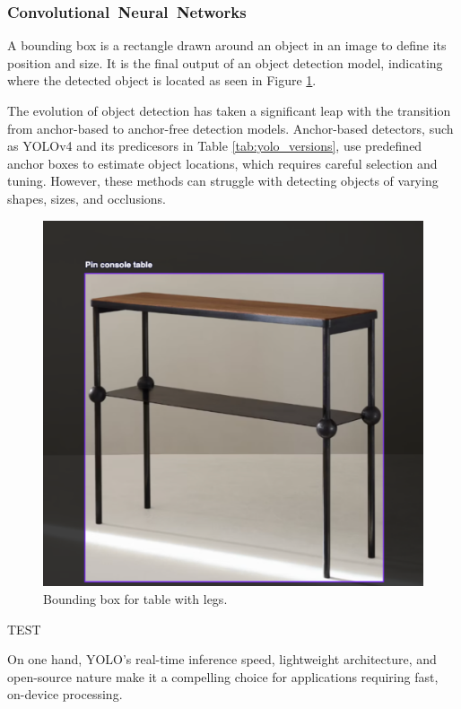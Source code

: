 \documentclass[a4paper,10pt,twocolumn]{article}
\numberwithin{figure}{section}
\numberwithin{table}{section}
\begin{document}
\vspace{0.3cm}
\subsubsection{\mbox{Convolutional Neural Networks}}
\vspace{0.3cm}

A bounding box is a rectangle drawn around an object in an image to 
define its position and size. It is the final output of an object detection 
model, indicating where the detected object is located as seen in Figure \ref{fig:bounding}.

The evolution of object detection has taken a significant leap with 
the transition from anchor-based to anchor-free detection models. 
Anchor-based detectors, such as YOLOv4 and its predicesors in Table 
\ref{tab:yolo_versions}, use predefined anchor boxes to estimate object locations,
which requires careful selection and tuning. However, these methods can struggle 
with detecting objects of varying shapes, sizes, and occlusions.


\begin{figure}[h]
    \centering
    \includegraphics[width=0.7\linewidth]{bounding.png}  %
    \caption{Bounding box for table with legs.}
    \label{fig:bounding}  
\end{figure}





TEST


On one hand, YOLO’s real-time inference speed, lightweight architecture, 
and open-source nature make it a compelling choice for applications 
requiring fast, on-device processing. 
\end{document}
